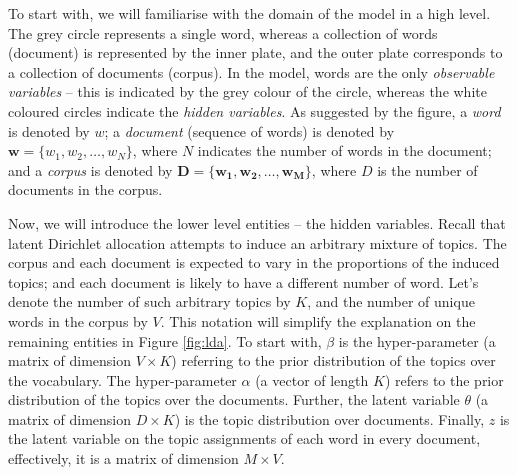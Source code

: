 \documentclass{mprop}
\begin{document}
\par To start with, we will familiarise with the domain of the model in a high level. The grey circle represents a single word, whereas a collection of words (document) is represented by the inner plate, and the outer plate corresponds to a collection of documents (corpus). In the model, words are the only \textit{observable variables} -- this is indicated by the grey colour of the circle, whereas the white coloured circles indicate the \textit{hidden variables}. As suggested by the figure, a \textit{word} is denoted by $w$; a \textit{document} (sequence of words) is denoted by $\mathbf{w} = \{w_1, w_2, \dots, w_N\}$, where $N$ indicates the number of words in the document; and a \textit{corpus} is denoted by $\mathcal{\mathbf{D}} = \{\mathbf{w_1}, \mathbf{w_2}, \dots, \mathbf{w_M}\}$, where $D$ is the number of documents in the corpus. 
 
\par Now, we will introduce the lower level entities -- the hidden variables. Recall that latent Dirichlet allocation attempts to induce an arbitrary mixture of topics. The corpus and each document is expected to vary in the proportions of the induced topics; and each document is likely to have a different number of word. Let's denote the number of such arbitrary topics by $K$, and the number of unique words in the corpus by $V$. This notation will simplify the explanation on the remaining entities in Figure \ref{fig:lda}. To start with, $\beta$ is the hyper-parameter (a matrix of dimension $V \times K$) referring to the prior distribution of the topics over the vocabulary. The hyper-parameter $\alpha$ (a vector of length $K$) refers to the prior distribution of the topics over the documents. Further, the latent variable $\theta$ (a matrix of dimension $D \times K$) is the topic distribution over documents. Finally, $z$ is the latent variable on the topic assignments of each word in every document, effectively, it is a matrix of dimension $M \times V$.
\end{document}
